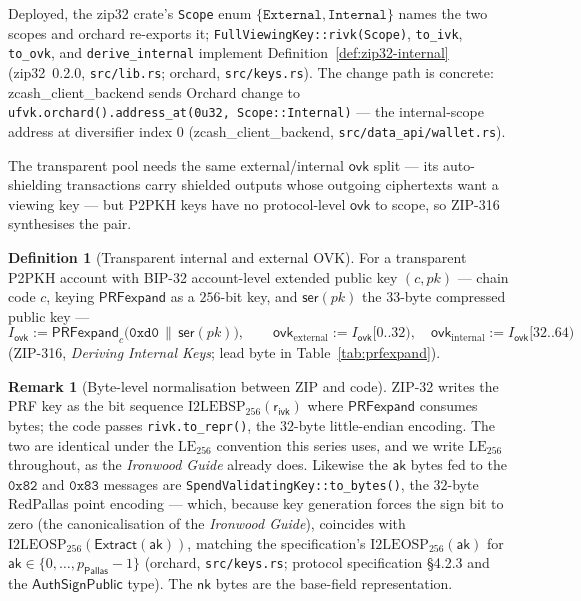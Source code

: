 \documentclass[11pt,a4paper]{article}
\theoremstyle{definition}
\newtheorem{definition}[theorem]{Definition}
\newtheorem{remark}[theorem]{Remark}
\newcommand{\Pallas}{\ensuremath{\mathsf{Pallas}}}
\newcommand{\Extract}{\ensuremath{\mathsf{Extract}}}
\newcommand{\aksym}{\ensuremath{\mathsf{ak}}}
\newcommand{\nksym}{\ensuremath{\mathsf{nk}}}
\newcommand{\ovk}{\ensuremath{\mathsf{ovk}}}
\newcommand{\rivk}{\ensuremath{\mathsf{r_{ivk}}}}
\begin{document}
Deployed, the \textsf{zip32} crate's \texttt{Scope} enum
$\{\texttt{External}, \texttt{Internal}\}$ names the two scopes and
\textsf{orchard} re-exports it; \texttt{FullViewingKey::rivk(Scope)},
\texttt{to\_ivk}, \texttt{to\_ovk}, and \texttt{derive\_internal} implement
Definition~\ref{def:zip32-internal} (\textsf{zip32}~0.2.0,
\texttt{src/lib.rs}; \textsf{orchard}, \texttt{src/keys.rs}). The change
path is concrete: \textsf{zcash\_client\_backend} sends Orchard change to
\texttt{ufvk.orchard().address\_at(0u32, Scope::Internal)} --- the
internal-scope address at diversifier index $0$
(\textsf{zcash\_client\_backend}, \texttt{src/data\_api/wallet.rs}).

The transparent pool needs the same external/internal $\ovk$ split ---
its auto-shielding transactions carry shielded outputs whose outgoing
ciphertexts want a viewing key --- but P2PKH keys have no protocol-level
$\ovk$ to scope, so ZIP-316 synthesises the pair.

\begin{definition}[Transparent internal and external OVK]%
\label{def:zip32-transparent-ovk}
For a transparent P2PKH account with BIP-32 account-level extended public
key $(c, pk)$ --- chain code $c$, keying $\mathsf{PRFexpand}$ as a
$256$-bit key, and $\mathsf{ser}(pk)$ the $33$-byte compressed public
key ---
\[
I_{\ovk} := \mathsf{PRFexpand}_{c}\bigl(\mathtt{0xd0} \,\|\,
\mathsf{ser}(pk)\bigr),
\qquad
\ovk_{\mathrm{external}} := I_{\ovk}[0..32),
\quad
\ovk_{\mathrm{internal}} := I_{\ovk}[32..64)
\]
(ZIP-316, \emph{Deriving Internal Keys}; lead byte in
Table~\ref{tab:prfexpand}).
\end{definition}

\begin{remark}[Byte-level normalisation between ZIP and code]
ZIP-32 writes the PRF key as the bit sequence
$\mathrm{I2LEBSP}_{256}(\rivk)$ where $\mathsf{PRFexpand}$ consumes bytes;
the code passes \texttt{rivk.to\_repr()}, the $32$-byte little-endian
encoding. The two are identical under the $\mathrm{LE}_{256}$ convention
this series uses, and we write $\mathrm{LE}_{256}$ throughout, as the
\emph{Ironwood Guide} already does. Likewise the $\aksym$ bytes fed to the
$\mathtt{0x82}$ and $\mathtt{0x83}$ messages are
\texttt{SpendValidatingKey::to\_bytes()}, the $32$-byte RedPallas point
encoding --- which, because key generation forces the sign bit to zero (the
canonicalisation of the \emph{Ironwood Guide}), coincides with
$\mathrm{I2LEOSP}_{256}(\Extract(\aksym))$, matching the specification's
$\mathrm{I2LEOSP}_{256}(\aksym)$ for
$\aksym \in \{0, \dots, p_{\Pallas}-1\}$ (\textsf{orchard},
\texttt{src/keys.rs}; protocol specification \S4.2.3 and the
$\mathsf{AuthSignPublic}$ type). The $\nksym$ bytes are the base-field
representation.
\end{remark}
\end{document}
